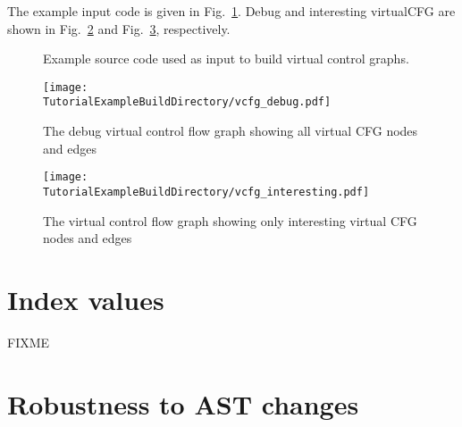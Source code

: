 The example input code is given in
Fig.~\ref{Tutorial:exampleInputCode_virtualCFG}. Debug and interesting virtualCFG 
are shown in Fig.~\ref{tutorial:exampleOutputCodeDebugPDF} and
Fig.~\ref{tutorial:exampleOutputCodeInterestingPDF}, respectively.

\begin{figure}[!h]
{\indent
  {\mySmallFontSize


    \begin{latexonly}
    
    \end{latexonly}

    \begin{htmlonly}
    
    \end{htmlonly}

  }
}
\label{Tutorial:exampleInputCode_virtualCFG}
\caption{Example source code used as input to build virtual control graphs.}
\end{figure}

\begin{figure}
\texttt{[image: \\TutorialExampleBuildDirectory/vcfg\_debug.pdf]}
\caption{The debug virtual control flow graph showing all virtual CFG nodes
and edges}
\label{tutorial:exampleOutputCodeDebugPDF}
\end{figure}


\begin{figure}
\texttt{[image: \\TutorialExampleBuildDirectory/vcfg\_interesting.pdf]}
\caption{The virtual control flow graph showing only interesting virtual CFG nodes and edges}
\label{tutorial:exampleOutputCodeInterestingPDF}
\end{figure}

\section{Index values}
\label{cfg_index_values}

FIXME

\section{Robustness to AST changes}

